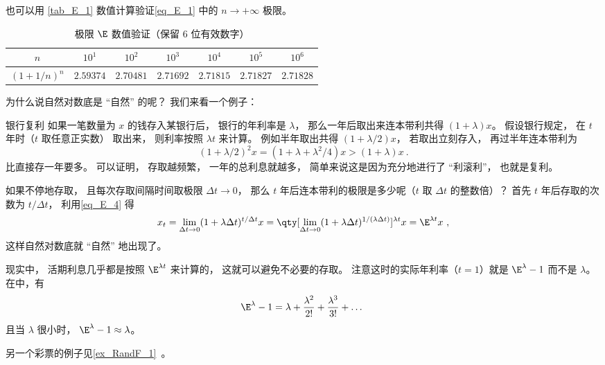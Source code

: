 也可以用 \autoref{tab_E_1} 数值计算验证\autoref{eq_E_1} 中的 $n\to+\infty$ 极限。
\begin{table}[ht]
\centering
\caption{极限 $\E$ 数值验证（保留 6 位有效数字）}\label{tab_E_1}
\begin{tabular}{|c|c|c|c|c|c|c|}
\hline
$n$ & $10^{1}$ & $10^{2}$ & $10^{3}$ & $10^{4}$ & $10^{5}$ & $10^{6}$ \\
\hline
$(1 + 1/n)^n$ & $2.59374$ & $2.70481$ & $2.71692$ & $2.71815$ & $2.71827$ & $2.71828$ \\
\hline
\end{tabular}
\end{table}

为什么说自然对数底是 “自然” 的呢？ 我们来看一个例子：

\begin{example}{银行复利}
如果一笔数量为 $x$ 的钱存入某银行后， 银行的年利率是 $\lambda$， 那么一年后取出来连本带利共得 $(1+\lambda)x$。 假设银行规定， 在 $t$ 年时（$t$ 取任意正实数） 取出来， 则利率按照 $\lambda t$ 来计算。 例如半年取出共得 $(1+\lambda/2)x$， 若取出立刻存入， 再过半年连本带利为
\begin{equation}
(1+\lambda/2)^2 x = (1 + \lambda + \lambda^2/4)x > (1 + \lambda) x~.
\end{equation}
比直接存一年要多。 可以证明， 存取越频繁， 一年的总利息就越多， 简单来说这是因为充分地进行了 “利滚利”， 也就是复利。

如果不停地存取， 且每次存取间隔时间取极限 $\Delta t \to 0$， 那么 $t$ 年后连本带利的极限是多少呢（$t$ 取 $\Delta t$ 的整数倍）？ 首先 $t$ 年后存取的次数为 $t/\Delta t$， 利用\autoref{eq_E_4} 得
\begin{equation}
x_t = \lim_{\Delta t\to 0}(1 + \lambda \Delta t)^{t/\Delta t} x
= \qty[\lim_{\Delta t\to 0}(1 + \lambda \Delta t)^{1/(\lambda \Delta t)}]^{\lambda t} x
= \E^{\lambda t} x~,
\end{equation}
这样自然对数底就 “自然” 地出现了。

现实中， 活期利息几乎都是按照 $\E^{\lambda t}$ 来计算的， 这就可以避免不必要的存取。 注意这时的实际年利率（$t = 1$）就是 $\E^\lambda - 1$ 而不是 $\lambda$。 在中，有
\begin{equation}
\E^\lambda - 1 = \lambda + \frac{\lambda^2}{2!} + \frac{\lambda^3}{3!} + \dots~
\end{equation}
且当 $\lambda$ 很小时， $\E^\lambda - 1 \approx \lambda$。
\end{example}

另一个彩票的例子见\autoref{ex_RandF_1}~。
